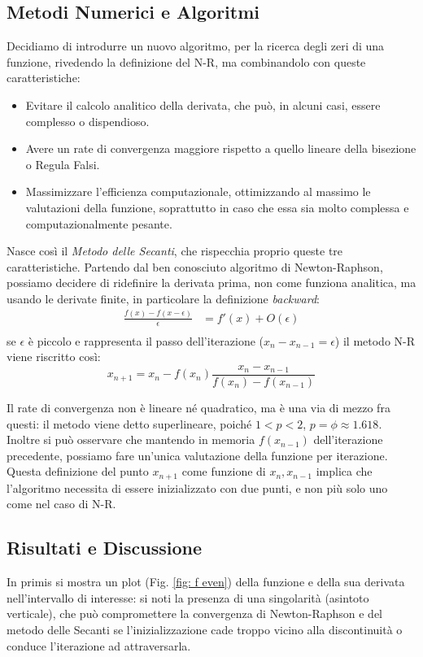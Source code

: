 \subsection{Metodi Numerici e Algoritmi}
Decidiamo di introdurre un nuovo algoritmo, per la ricerca degli zeri di una funzione, rivedendo la definizione del N-R, ma combinandolo con queste caratteristiche:
\begin{itemize}
    \item Evitare il calcolo analitico della derivata, che può, in alcuni casi, essere complesso o dispendioso.
    \item Avere un rate di convergenza maggiore rispetto a quello lineare della bisezione o Regula Falsi.
    \item Massimizzare l'efficienza computazionale, ottimizzando al massimo le valutazioni della funzione, soprattutto in caso che essa sia molto complessa e computazionalmente pesante.
\end{itemize}

Nasce così il \textit{Metodo delle Secanti}, che rispecchia proprio queste tre caratteristiche.
Partendo dal ben conosciuto algoritmo di Newton-Raphson, possiamo decidere di ridefinire la derivata prima, non come funziona analitica, ma usando le derivate finite, in particolare la definizione \textit{backward}:
\begin{align*}
\frac{f(x) - f(x-\epsilon)}{\epsilon} & = f'(x) + O(\epsilon) \\
\end{align*}
se $\epsilon$ è piccolo e rappresenta il passo dell'iterazione ($x_n - x_{n-1} = \epsilon$) il metodo N-R viene riscritto così:
\[
    x_{n+1} = x_n - f(x_n) \frac{x_n- x_{n-1}}{f(x_n) - f(x_{n-1})}
\]

Il rate di convergenza non è lineare né quadratico, ma è una via di mezzo fra questi: il metodo viene detto superlineare, poiché $1<p<2$, $p=\phi \approx1.618$. Inoltre si può osservare che mantendo in memoria $f(x_{n-1})$ dell'iterazione precedente, possiamo fare un'unica valutazione della funzione per iterazione. Questa definizione del punto $x_{n+1}$ come funzione di $x_n, x_{n-1}$ implica che l'algoritmo necessita di essere inizializzato con due punti, e non più solo uno come nel caso di N-R.

\subsection{Risultati e Discussione}
In primis si mostra un plot (Fig. \ref{fig: f even}) della funzione e della sua derivata nell'intervallo di interesse: si noti la presenza di una singolarità (asintoto verticale), che può compromettere la convergenza di Newton-Raphson e del metodo delle Secanti se l'inizializzazione cade troppo vicino alla discontinuità o conduce l'iterazione ad attraversarla.

